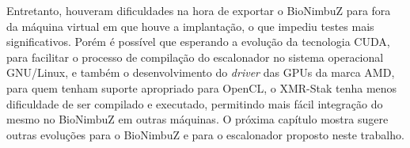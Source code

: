 Entretanto, houveram dificuldades na hora de exportar o BioNimbuZ para fora da máquina virtual em que houve a implantação, o que impediu testes mais significativos. Porém é possível que esperando a evolução da tecnologia \acrshort{CUDA}, para facilitar o processo de compilação do escalonador no sistema operacional \acrshort{GNU}/Linux, e também o desenvolvimento do \textit{driver} das \acrshort{GPU}s da marca \acrshort{AMD}, para quem tenham suporte apropriado para OpenCL, o XMR-Stak tenha menos dificuldade de ser compilado e executado, permitindo mais fácil integração do mesmo no BioNimbuZ em outras máquinas. O próxima capítulo mostra sugere outras evoluções para o BioNimbuZ e para o escalonador proposto neste trabalho.
